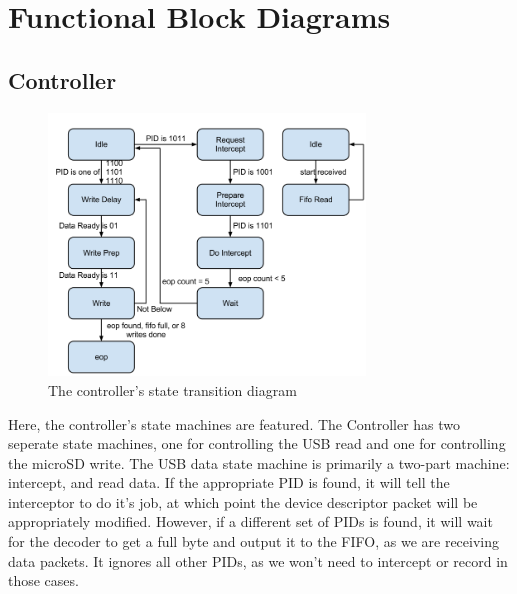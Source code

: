 \documentclass[12pt,letter,oneside]{report}
\begin{document}
\section{Functional Block Diagrams}
\subsection{Controller}
\begin{figure}[h!]
	\centering
	\caption{The controller's state transition diagram}
	\includegraphics[width=0.75\textwidth]{controllerTrans}
\end{figure}
Here, the controller's state machines are featured. The Controller has two seperate state machines, one for controlling the USB read and one for controlling the microSD write. The USB data state machine is primarily a two-part machine: intercept, and read data. If the appropriate PID is found, it will tell the interceptor to do it's job, at which point the device descriptor packet will be appropriately modified. However, if a different set of PIDs is found, it will wait for the decoder to get a full byte and output it to the FIFO, as we are receiving data packets. It ignores all other PIDs, as we won't need to intercept or record in those cases.
\pagebreak
\end{document}
